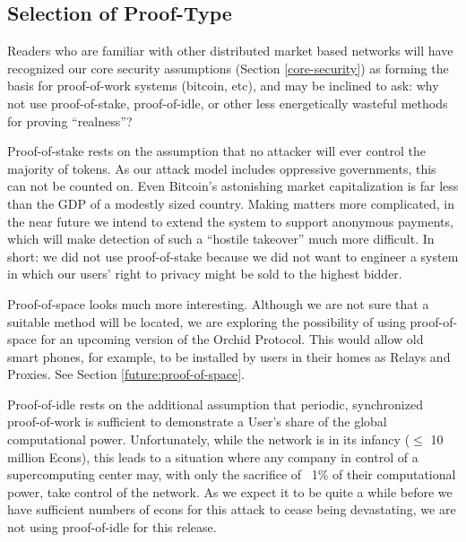 \documentclass{article}
\newcommand{\orchid}{Orchid}
\newcommand{\Orchid}{\orchid}
\begin{document}

\subsection{Selection of Proof-Type}

Readers who are familiar with other distributed market based networks will have recognized our core security assumptions (Section \ref{core-security}) as forming the basis for proof-of-work systems (bitcoin, etc), and may be inclined to ask: why not use proof-of-stake, proof-of-idle, or other less energetically wasteful methods for proving “realness”?

Proof-of-stake rests on the assumption that no attacker will ever control the majority of tokens. As our attack model includes oppressive governments, this can not be counted on. Even Bitcoin’s astonishing market capitalization is far less than the GDP of a modestly sized country. Making matters more complicated, in the near future we intend to extend the system to support anonymous payments, which will make detection of such a ``hostile takeover'' much more difficult. In short: we did not use proof-of-stake because we did not want to engineer a system in which our users’ right to privacy might be sold to the highest bidder.

Proof-of-space looks much more interesting. Although we are not sure that a suitable method will be located, we are exploring the possibility of using proof-of-space for an upcoming version of the \Orchid{} Protocol. This would allow old smart phones, for example, to be installed by users in their homes as Relays and Proxies. See Section \ref{future:proof-of-space}.

Proof-of-idle rests on the additional assumption that periodic, synchronized proof-of-work is sufficient to demonstrate a User’s share of the global computational power. Unfortunately, while the network is in its infancy ($\leq$ 10 million Econs), this leads to a situation where any company in control of a supercomputing center may, with only the sacrifice of ~1\% of their computational power, take control of the network. As we expect it to be quite a while before we have sufficient numbers of econs for this attack to cease being devastating, we are not using proof-of-idle for this release.
\end{document}
